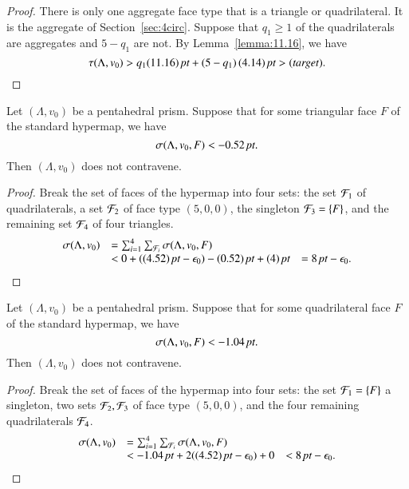 \begin{proof} There is only one aggregate face type that is a triangle or quadrilateral.  It is the aggregate of Section~\ref{sec:4circ}.   Suppose that $q_1\ge 1$ of the quadrilaterals are aggregates and $5-q_1$ are not. 
By Lemma~\ref{lemma:11.16}, we have
   $$
   \tau(\Lambda,v_0) > q_1 (11.16)\,\hbox{\it pt} + (5-q_1)\,(4.14)\,\hbox{\it pt}
    > (\operatorname{\it{target}}).
   $$
\end{proof}

\begin{lemma}
Let $(\Lambda,v_0)$ be a pentahedral prism.  Suppose that for some triangular face $F$ of the standard hypermap, we have
  $$
  \sigma(\Lambda,v_0,F) < -0.52\,\hbox{\it pt}.
  $$
Then $(\Lambda,v_0)$ does not contravene.
\end{lemma}

\begin{proof}
Break the set of faces of the hypermap into four sets:
the set ${\mathcal F}_1$ of quadrilaterals, a set ${\mathcal F}_2$ of face type $(5,0,0)$,
the singleton ${\mathcal F}_3=\{F\}$, and the remaining set ${\mathcal F}_4$ of four
triangles.
  $$
  \begin{array}{llll}
  \sigma(\Lambda,v_0) &= \sum_{i=1}^4\sum_{{\mathcal F}_i}\sigma(\Lambda,v_0,F)\\
    &< 0 + ((4.52)\,\hbox{\it pt} - \epsilon_0) - (0.52)\,\hbox{\it pt} + (4)\,\hbox{\it pt}
    &= 8\,\hbox{\it pt} - \epsilon_0.
  \end{array}
  $$
\end{proof}

\begin{lemma}
Let $(\Lambda,v_0)$ be a pentahedral prism.  Suppose that for some 
quadrilateral face $F$ of the standard hypermap, we have
  $$
  \sigma(\Lambda,v_0,F) < -1.04\,\hbox{\it pt}.
  $$
Then $(\Lambda,v_0)$ does not contravene.
\end{lemma}

\begin{proof}
Break the set of faces of the hypermap into four sets:
the set ${\mathcal F}_1=\{F\}$ a singleton, two sets ${\mathcal F}_2,{\mathcal F}_3$ of
face type $(5,0,0)$, and the four remaining quadrilaterals ${\mathcal F}_4$.
  $$
  \begin{array}{llll}
  \sigma(\Lambda,v_0) &= \sum_{i=1}^4\sum_{{\mathcal F}_i}\sigma(\Lambda,v_0,F)\\
    &< -1.04\,\hbox{\it pt} + 2((4.52)\,\hbox{\it pt} - \epsilon_0) + 0
    &< 8\,\hbox{\it pt} - \epsilon_0.
  \end{array}
  $$
\end{proof}

